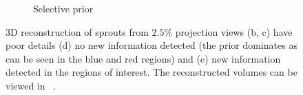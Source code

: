 \documentclass[journal]{IEEEtran}
\begin{document}
\begin{figure}[!h]
\begin{subfigure}[b]{0.3\linewidth}
        \caption{Selective prior}
     \end{subfigure}
     \caption{3D reconstruction of sprouts from $2.5\%$ projection views
   (b, c) have poor details (d) no new information detected (the
   prior dominates as can be seen in the blue and red regions) and
   (e) new information detected in the regions of interest. The reconstructed volumes can be viewed in ~\cite{supp_paper}.} 
\label{fig:sprouts_3D_results}
\end{figure}


\begin{figure}[!h]
  \centering
  \hfill
    \hfill
      \hfill
        \hfill
        \hfill

\end{figure}
\end{document}
